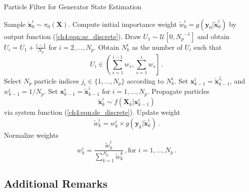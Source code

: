 \begin{algorithm}
\caption{Particle Filter for Generator State Estimation}\label{alg:particle_filter}
\begin{algorithmic}[1]
  
\State Sample $\tilde{\boldsymbol{x}}_0^{i} \sim \pi_0(\boldsymbol{X})$.
\State Compute initial importance weight
$
\tilde{w}_0^{i} = g(\boldsymbol{y}_0 | \tilde{\boldsymbol{x}}_0^{i})
$ by output function (\ref{ch4:eqn:ae_discrete}).
\EndFor
{}
 
\State Draw $U_{1} \sim \mathcal{U}\left[0, {N_p}^{-1}\right]$ and obtain $U_{i}=U_{1}+\frac{i-1}{N_p}$ for $i=2, \ldots, N_p$.
\State Obtain $N_k^{i}$ as the number of $U_i$ such that
$$
U_i \in \left(\sum_{s=1}^{i-1} w_{s}, \sum_{s=1}^{i} w_{s}\right] \,.
$$ 
\State Select $N_p$ particle indices $j_i \in \{1, \dots, N_p\}$ according to $N_k^{i}$.
\State Set $\boldsymbol{x}_{k-1}^{i} = \tilde{\boldsymbol{x}}_{k-1}^{j_i}$, and $w_{k-1}^{i} = 1/N_p$.
\EndFor
\Else 
\State Set $\boldsymbol{x}_{k-1}^{i} = \tilde{\boldsymbol{x}}_{k-1}^{i}$ for $i=1, \ldots, N_p$.
\EndIf
{}
\State Propagate particles 
$$
\tilde{\boldsymbol{x}}_k^{i} \sim f(\boldsymbol{X}_k|\boldsymbol{x}_{k-1}^{i})
$$ via system function (\ref{ch4:eqn:de_discrete}).
\State Update weight 
$$
\tilde{w}_k^{i} = {w}_k^{i} \times g(\boldsymbol{y}_k | \tilde{\boldsymbol{x}}_k^{i}) \,.
$$
\EndFor
\State Normalize weights
$$
w_k^{i} = \frac{\tilde{w}_k^{i}}{\sum_{k=1}^{N_p}\tilde{w}_k^{k}} \,, \text{for } i = 1, \dots, N_p \,.
$$
\EndFor
\end{algorithmic}
\end{algorithm}



\subsection{Additional Remarks} %
\label{ssub:additional_remarks}
